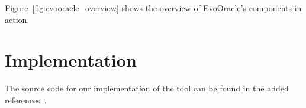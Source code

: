 Figure~\ref{fig:evooracle_overview} shows the overview of EvoOracle's components in action.

\section{Implementation}
\label{sec:implementation}
\vspace{0.2 cm}

The source code for our implementation of the tool can be found in the added references~\cite{evooracle_github}.
